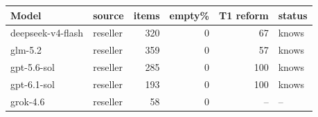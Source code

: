 \begin{tabular}{@{}l l r r r l@{}}
\toprule
Model & source & items & empty\% & T1 reform & status \\
\midrule
deepseek-v4-flash & reseller & 320 & 0 & 67 & knows \\
glm-5.2 & reseller & 359 & 0 & 57 & knows \\
gpt-5.6-sol & reseller & 285 & 0 & 100 & knows \\
gpt-6.1-sol & reseller & 193 & 0 & 100 & knows \\
grok-4.6 & reseller & 58 & 0 & -- & -- \\
\bottomrule
\end{tabular}
